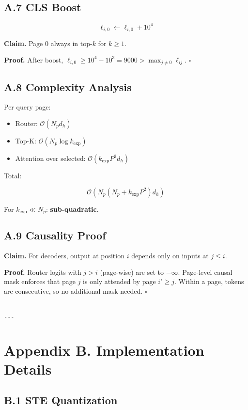 \subsection{A.7 CLS Boost}

\[
\ell_{i, 0} \leftarrow \ell_{i, 0} + 10^4
\tag{A.14}
\]

\textbf{Claim.} Page 0 always in top-$k$ for $k \geq 1$.

\textbf{Proof.} After boost, $\ell_{i, 0} \geq 10^4 - 10^3 = 9000 > \max_{j \neq 0} \ell_{ij}$. $\square$

\subsection{A.8 Complexity Analysis}

Per query page:
\begin{itemize}
\item Router: $\mathcal{O}(N_p d_h)$
\item Top-K: $\mathcal{O}(N_p \log k_\text{exp})$
\item Attention over selected: $\mathcal{O}(k_\text{exp} P^2 d_h)$

\end{itemize}
Total:

\[
\mathcal{O}(N_p (N_p + k_\text{exp} P^2) d_h)
\tag{A.15}
\]

For $k_\text{exp} \ll N_p$: \textbf{sub-quadratic}.

\subsection{A.9 Causality Proof}

\textbf{Claim.} For decoders, output at position $i$ depends only on inputs at $j \leq i$.

\textbf{Proof.} Router logits with $j > i$ (page-wise) are set to $-\infty$. 
Page-level causal mask enforces that page $j$ is only attended by page $i' \geq j$. Within a page, tokens are consecutive, so no additional mask needed. $\square$
\begin{lstlisting}

---
\end{lstlisting}

\section{Appendix B. Implementation Details}

\subsection{B.1 STE Quantization}

